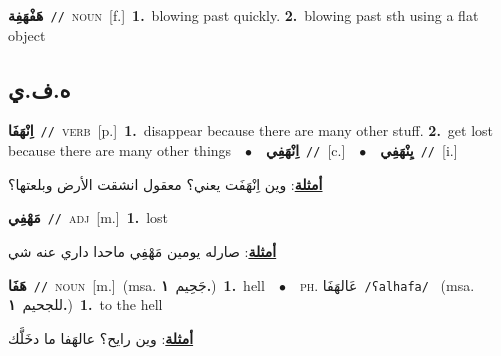 \documentclass[10pt,a4paper,twoside]{article} %
\begin{document}
\begin{multicols}{2}
{\setlength\topsep{0pt}\textbf{\foreignlanguage{arabic}{هَفْهَفِة}}\ {\color{gray}\texttt{//}\color{black}}\ \textsc{noun}\ [f.]\ \textbf{1.}~blowing past quickly.  \textbf{2.}~blowing past sth using a flat object\ } \vspace{2mm}

\vspace{-3mm}
\subsection*{\color{blue}\foreignlanguage{arabic}{ه.ف.ي}\color{blue}{}} 

{\setlength\topsep{0pt}\textbf{\foreignlanguage{arabic}{اِنْهَفَا}}\ {\color{gray}\texttt{//}\color{black}}\ \textsc{verb}\ [p.]\ \textbf{1.}~disappear because there are many other stuff.  \textbf{2.}~get lost because there are many other things\ \ $\bullet$\ \ \setlength\topsep{0pt}\textbf{\foreignlanguage{arabic}{اِنْهَفِي}}\ {\color{gray}\texttt{//}\color{black}}\ [c.]\ \ $\bullet$\ \ \setlength\topsep{0pt}\textbf{\foreignlanguage{arabic}{يِنْهَفِي}}\ {\color{gray}\texttt{//}\color{black}}\ [i.]\  \begin{flushright}\color{gray}\foreignlanguage{arabic}{\textbf{\underline{\foreignlanguage{arabic}{أمثلة}}}: وين اِنْهَفَت يعني؟ معقول انشقت الأرض وبلعتها؟}\end{flushright}\color{black}} \vspace{2mm}

{\setlength\topsep{0pt}\textbf{\foreignlanguage{arabic}{مَهْفِي}}\ {\color{gray}\texttt{//}\color{black}}\ \textsc{adj}\ [m.]\ \textbf{1.}~lost\  \begin{flushright}\color{gray}\foreignlanguage{arabic}{\textbf{\underline{\foreignlanguage{arabic}{أمثلة}}}: صارله يومين مَهْفِي ماحدا داري عنه شي}\end{flushright}\color{black}} \vspace{2mm}

{\setlength\topsep{0pt}\textbf{\foreignlanguage{arabic}{هَفَا}}\ {\color{gray}\texttt{//}\color{black}}\ \textsc{noun}\ [m.]\ \color{gray}(msa. \foreignlanguage{arabic}{جَحِيم}~\foreignlanguage{arabic}{\textbf{١.}})\color{black}\ \textbf{1.}~hell\ \ $\bullet$\ \ \textsc{ph.} \color{gray} \foreignlanguage{arabic}{عَالهَفَا}\color{black}\ {\color{gray}\texttt{/{\sffamily ʕalhafa}/}\color{black}}\ \color{gray} (msa. \foreignlanguage{arabic}{للجحيم}~\foreignlanguage{arabic}{\textbf{١.}})\color{black}\ \textbf{1.}~to the hell\  \begin{flushright}\color{gray}\foreignlanguage{arabic}{\textbf{\underline{\foreignlanguage{arabic}{أمثلة}}}: وين رايح؟ عالهَفا ما دخَلَّك}\end{flushright}\color{black}} \vspace{2mm}


\end{multicols}
\end{document}
